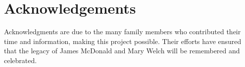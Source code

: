\chapter{Acknowledgements}
\label{acknowledgements}

Acknowledgments are due to the many family members who contributed their time and information, making this project possible. Their efforts have ensured that the legacy of James McDonald and Mary Welch will be remembered and celebrated.